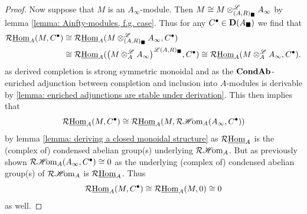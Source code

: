 \begin{proof}
	Now suppose that $M$ is an $A_\infty$-module. Then $M\cong M\otimes^{\mathscr{L}}_{(A, R)_\blacksquare} A_\infty$ by lemma \ref{lemma: Ainfty-modules, f.g. case}. Thus for any $C^\bullet \in {{\mathbf{D}}(A_\blacksquare)}$ we find that
	\begin{align*}
		\eRHom_A(M, C^\bullet) & \cong \eRHom_A(M\Dotimes_{(A, R)_\blacksquare} A_\infty, C^\bullet)\\
		&\cong \eRHom_A(\derivedCompletion{M\Dotimes_A A_\infty}{(A, R)_\blacksquare}, C^\bullet) \cong \eRHom_A(M\Dotimes_A A_\infty, C^\bullet).
	\end{align*}
	as derived completion is strong symmetric monoidal and as the ${{{\mathbf{Cond}}}{{\mathbf{Ab}}}}$-enriched adjunction between completion and inclusion into $A$-modules is derivable by \ref{lemma: enriched adjunctions are stable under derivation}. This then implies that
		$$\mathcal{R}{\underline{\operatorname{Hom}}}_A(M, C^\bullet) \cong \mathcal{R}{\underline{\operatorname{Hom}}}_A(M, \mathcal{R}{\operatorname{\mathscr{H}\!om}}_A(A_\infty, C^\bullet))$$
	by lemma \ref{lemma: deriving a closed monoidal structure} as $\mathcal{R}{\underline{\operatorname{Hom}}}_A$ is the (complex of) condensed abelian group(s) underlying $\mathcal{R}{\operatorname{\mathscr{H}\!om}}_A$. But as previously shown $\mathcal{R}{\operatorname{\mathscr{H}\!om}}_A(A_\infty, C^\bullet) \cong 0$ as the underlying (complex of) condensed abelian group(s) of $\mathcal{R}{\operatorname{\mathscr{H}\!om}}_A$ is $\mathcal{R}{\underline{\operatorname{Hom}}}_A$. Thus
		$$\mathcal{R}{\underline{\operatorname{Hom}}}_A(M,C^\bullet) \cong \mathcal{R}{\underline{\operatorname{Hom}}}_A(M, 0) \cong 0$$
	as well.
\end{proof}


